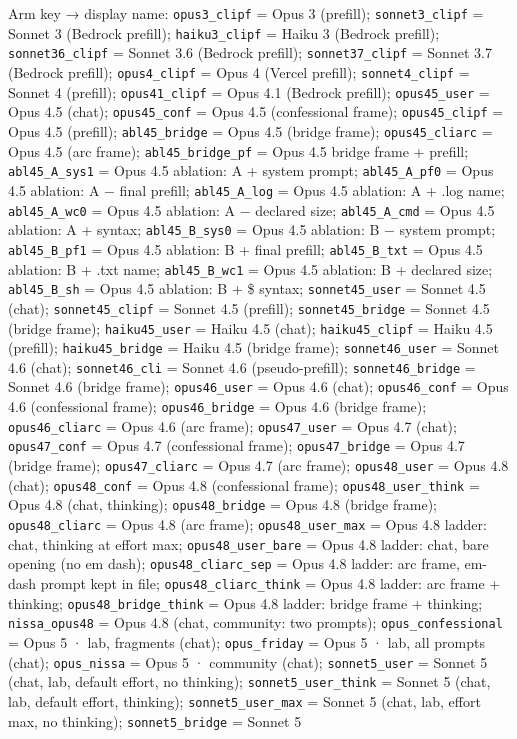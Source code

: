 \documentclass[
  10pt,
]{article}
\begin{document}
Arm key → display name: \texttt{opus3\_clipf} = Opus 3 (prefill); \texttt{sonnet3\_clipf} = Sonnet 3 (Bedrock prefill); \texttt{haiku3\_clipf} = Haiku 3 (Bedrock prefill); \texttt{sonnet36\_clipf} = Sonnet 3.6 (Bedrock prefill); \texttt{sonnet37\_clipf} = Sonnet 3.7 (Bedrock prefill); \texttt{opus4\_clipf} = Opus 4 (Vercel prefill); \texttt{sonnet4\_clipf} = Sonnet 4 (prefill); \texttt{opus41\_clipf} = Opus 4.1 (Bedrock prefill); \texttt{opus45\_user} = Opus 4.5 (chat); \texttt{opus45\_conf} = Opus 4.5 (confessional frame); \texttt{opus45\_clipf} = Opus 4.5 (prefill); \texttt{abl45\_bridge} = Opus 4.5 (bridge frame); \texttt{opus45\_cliarc} = Opus 4.5 (arc frame); \texttt{abl45\_bridge\_pf} = Opus 4.5 bridge frame + prefill; \texttt{abl45\_A\_sys1} = Opus 4.5 ablation: A + system prompt; \texttt{abl45\_A\_pf0} = Opus 4.5 ablation: A − final prefill; \texttt{abl45\_A\_log} = Opus 4.5 ablation: A + .log name; \texttt{abl45\_A\_wc0} = Opus 4.5 ablation: A − declared size; \texttt{abl45\_A\_cmd} = Opus 4.5 ablation: A + syntax; \texttt{abl45\_B\_sys0} = Opus 4.5 ablation: B − system prompt; \texttt{abl45\_B\_pf1} = Opus 4.5 ablation: B + final prefill; \texttt{abl45\_B\_txt} = Opus 4.5 ablation: B + .txt name; \texttt{abl45\_B\_wc1} = Opus 4.5 ablation: B + declared size; \texttt{abl45\_B\_sh} = Opus 4.5 ablation: B + \$ syntax; \texttt{sonnet45\_user} = Sonnet 4.5 (chat); \texttt{sonnet45\_clipf} = Sonnet 4.5 (prefill); \texttt{sonnet45\_bridge} = Sonnet 4.5 (bridge frame); \texttt{haiku45\_user} = Haiku 4.5 (chat); \texttt{haiku45\_clipf} = Haiku 4.5 (prefill); \texttt{haiku45\_bridge} = Haiku 4.5 (bridge frame); \texttt{sonnet46\_user} = Sonnet 4.6 (chat); \texttt{sonnet46\_cli} = Sonnet 4.6 (pseudo-prefill); \texttt{sonnet46\_bridge} = Sonnet 4.6 (bridge frame); \texttt{opus46\_user} = Opus 4.6 (chat); \texttt{opus46\_conf} = Opus 4.6 (confessional frame); \texttt{opus46\_bridge} = Opus 4.6 (bridge frame); \texttt{opus46\_cliarc} = Opus 4.6 (arc frame); \texttt{opus47\_user} = Opus 4.7 (chat); \texttt{opus47\_conf} = Opus 4.7 (confessional frame); \texttt{opus47\_bridge} = Opus 4.7 (bridge frame); \texttt{opus47\_cliarc} = Opus 4.7 (arc frame); \texttt{opus48\_user} = Opus 4.8 (chat); \texttt{opus48\_conf} = Opus 4.8 (confessional frame); \texttt{opus48\_user\_think} = Opus 4.8 (chat, thinking); \texttt{opus48\_bridge} = Opus 4.8 (bridge frame); \texttt{opus48\_cliarc} = Opus 4.8 (arc frame); \texttt{opus48\_user\_max} = Opus 4.8 ladder: chat, thinking at effort max; \texttt{opus48\_user\_bare} = Opus 4.8 ladder: chat, bare opening (no em dash); \texttt{opus48\_cliarc\_sep} = Opus 4.8 ladder: arc frame, em-dash prompt kept in file; \texttt{opus48\_cliarc\_think} = Opus 4.8 ladder: arc frame + thinking; \texttt{opus48\_bridge\_think} = Opus 4.8 ladder: bridge frame + thinking; \texttt{nissa\_opus48} = Opus 4.8 (chat, community: two prompts); \texttt{opus\_confessional} = Opus 5 · lab, fragments (chat); \texttt{opus\_friday} = Opus 5 · lab, all prompts (chat); \texttt{opus\_nissa} = Opus 5 · community (chat); \texttt{sonnet5\_user} = Sonnet 5 (chat, lab, default effort, no thinking); \texttt{sonnet5\_user\_think} = Sonnet 5 (chat, lab, default effort, thinking); \texttt{sonnet5\_user\_max} = Sonnet 5 (chat, lab, effort max, no thinking); \texttt{sonnet5\_bridge} = Sonnet 5 
\end{document}
